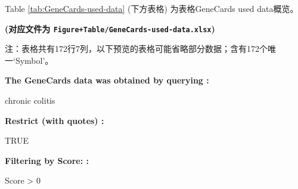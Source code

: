 \documentclass[
]{article}
\begin{document}
Table \ref{tab:GeneCards-used-data} (下方表格) 为表格GeneCards used data概览。

\textbf{(对应文件为 \texttt{Figure+Table/GeneCards-used-data.xlsx})}

\begin{center}\begin{tcolorbox}[colback=gray!10, colframe=gray!50, width=0.9\linewidth, arc=1mm, boxrule=0.5pt]注：表格共有172行7列，以下预览的表格可能省略部分数据；含有172个唯一`Symbol'。
\end{tcolorbox}
\end{center}\begin{center}\begin{tcolorbox}[colback=gray!10, colframe=gray!50, width=0.9\linewidth, arc=1mm, boxrule=0.5pt]
\textbf{
The GeneCards data was obtained by querying
:}

\vspace{0.5em}

    chronic colitis

\vspace{2em}


\textbf{
Restrict (with quotes)
:}

\vspace{0.5em}

    TRUE

\vspace{2em}


\textbf{
Filtering by Score:
:}

\vspace{0.5em}

    Score > 0

\vspace{2em}
\end{tcolorbox}
\end{center}
\end{document}
